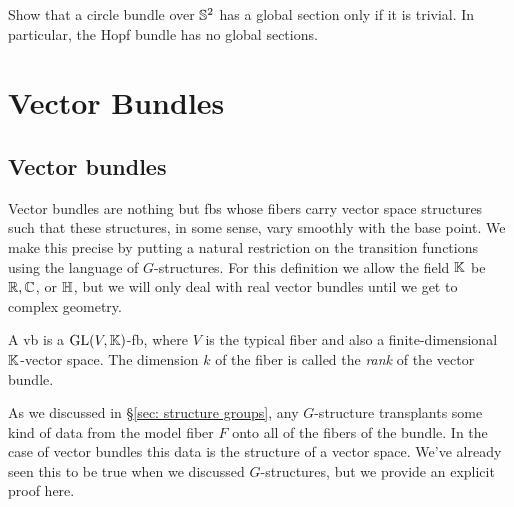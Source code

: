 \begin{xca}
    Show that a circle bundle over $\mathbb{S}^2$ has a global section only if it is trivial. In particular, the Hopf bundle has no global sections.
\end{xca}

\clearpage
\chapter{Vector Bundles}


\section{Vector bundles}

Vector bundles are nothing but \glspl{fb} whose fibers carry vector space structures such that these structures, in some sense, vary smoothly with the base point. We make this precise by putting a natural restriction on the transition functions using the language of $G$-structures. For this definition we allow the field $\mathbb{K}$ be $\mathbb{R},\mathbb{C}$, or $\mathbb{H}$, but we will only deal with real vector bundles until we get to complex geometry.

\begin{defn}
    A \gls{vb} is a $\operatorname{GL}(V,\mathbb{K})$-\gls{fb}, where $V$ is the typical fiber and also a finite-dimensional $\mathbb{K}$-vector space. The dimension $k$ of the fiber is called the \emph{rank} of the vector bundle.
\end{defn}

As we discussed in \S\ref{sec: structure groups}, any $G$-structure transplants some kind of data from the model fiber $F$ onto all of the fibers of the bundle. In the case of vector bundles this data is the structure of a vector space. We've already seen this to be true when we discussed $G$-structures, but we provide an explicit proof here.

